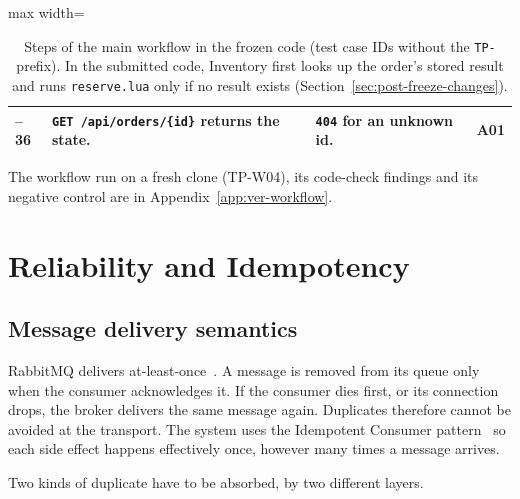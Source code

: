 \documentclass[a4paper]{report}
\begin{document}
\begin{table}[tbp]
\begin{adjustbox}{max width=\linewidth}
\begin{tabular}{@{}>{\raggedright\arraybackslash}p{1.1cm}>{\raggedright\arraybackslash}p{5.6cm}>{\raggedright\arraybackslash}p{5.4cm}>{\raggedright\arraybackslash}p{1.6cm}@{}}
35--36 & \texttt{GET /api/orders/\{id\}} returns the state. & \texttt{404} for an unknown id. & A01 \\
\bottomrule
\end{tabular}
\end{adjustbox}
\caption{Steps of the main workflow in the frozen code (test case IDs without
the \texttt{TP-} prefix). In the submitted code, Inventory first looks up
the order's stored result and runs \texttt{reserve.lua} only if no result
exists (Section~\ref{sec:post-freeze-changes}).}
\label{tab:workflow}
\end{table}

The workflow run on a fresh clone (TP-W04), its code-check findings and its negative control are in Appendix~\ref{app:ver-workflow}.

\section{Reliability and Idempotency}
\label{sec:week9}

\subsection{Message delivery semantics}

RabbitMQ delivers at-least-once~\cite{rmq-confirms}. A message is removed
from its queue only when the consumer acknowledges it. If the consumer dies first, or its
connection drops, the broker delivers the same message again. Duplicates
therefore cannot be avoided at the transport. The system uses the Idempotent
Consumer pattern~\cite{richardson-idempotent,eip-idempotent} so each side
effect happens effectively once, however many times a message arrives.

Two kinds of duplicate have to be absorbed, by two different layers.
\end{document}
